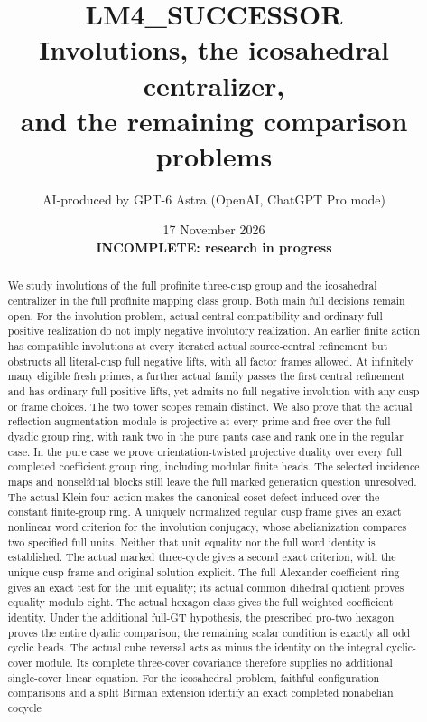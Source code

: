 \documentclass[11pt,a4paper]{article}
\title{LM4\_SUCCESSOR\\Involutions, the icosahedral centralizer,\\and the remaining comparison problems}
\author{AI-produced by GPT-6 Astra (OpenAI, ChatGPT Pro mode)}
\date{17 November 2026\\\textbf{INCOMPLETE: research in progress}}
\begin{document}
\maketitle
\begin{abstract}
We study involutions of the full profinite three-cusp group and
the icosahedral centralizer in the full profinite mapping class group.
Both main full decisions remain open.
For the involution problem, actual central compatibility and ordinary
full positive realization do not imply negative involutory realization.
An earlier finite action has compatible involutions at every iterated
actual source-central refinement but obstructs all literal-cusp full
negative lifts, with all factor frames allowed. At infinitely many
eligible fresh primes, a further actual family passes the first central
refinement and has ordinary full positive lifts, yet admits no full
negative involution with any cusp or frame choices. The two tower scopes
remain distinct. We also prove that the actual reflection augmentation
module is projective at every prime and free over the full dyadic group
ring, with rank two in the pure pants case and rank one in the regular
case. In the pure case we prove orientation-twisted projective duality
over every full completed coefficient group ring, including modular
finite heads. The selected incidence maps and nonselfdual blocks still
leave the full marked generation question unresolved. The actual
Klein four action makes the canonical coset defect induced over the
constant finite-group ring. A uniquely normalized regular cusp frame
gives an exact nonlinear word criterion for the involution conjugacy,
whose abelianization compares two specified full units. Neither that
unit equality nor the full word identity is established. The actual
marked three-cycle gives a second exact criterion, with the unique cusp
frame and original solution explicit. The full Alexander coefficient
ring gives an exact test for the unit equality; its actual common
dihedral quotient proves equality modulo eight. The actual hexagon class gives
the full weighted coefficient identity. Under the additional full-GT
hypothesis, the prescribed pro-two hexagon proves the entire dyadic
comparison; the remaining scalar condition is exactly all odd cyclic
heads. The actual cube reversal acts as minus the identity on the
integral cyclic-cover module. Its complete three-cover covariance
therefore supplies no additional single-cover linear equation.
For the icosahedral problem, faithful configuration comparisons and a
split Birman extension identify an exact completed nonabelian cocycle

\end{abstract}
\end{document}
